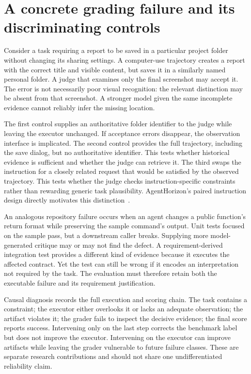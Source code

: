 \section{A concrete grading failure and its discriminating controls}\label{sec:C23:gradingcase}
Consider a task requiring a report to be saved in a particular project folder without changing its sharing settings. A computer-use trajectory creates a report with the correct title and visible content, but saves it in a similarly named personal folder. A judge that examines only the final screenshot may accept it. The error is not necessarily poor visual recognition: the relevant distinction may be absent from that screenshot. A stronger model given the same incomplete evidence cannot reliably infer the missing location.

The first control supplies an authoritative folder identifier to the judge while leaving the executor unchanged. If acceptance errors disappear, the observation interface is implicated. The second control provides the full trajectory, including the save dialog, but no authoritative identifier. This tests whether historical evidence is sufficient and whether the judge can retrieve it. The third swaps the instruction for a closely related request that would be satisfied by the observed trajectory. This tests whether the judge checks instruction-specific constraints rather than rewarding generic task plausibility. AgentHorizon's paired instruction design directly motivates this distinction~\cite{corpus261011050}.

An analogous repository failure occurs when an agent changes a public function's return format while preserving the sample command's output. Unit tests focused on the sample pass, but a downstream caller breaks. Supplying more model-generated critique may or may not find the defect. A requirement-derived integration test provides a different kind of evidence because it executes the affected contract. Yet the test can still be wrong if it encodes an interpretation not required by the task. The evaluation must therefore retain both the executable failure and its requirement justification.

Causal diagnosis records the full execution and scoring chain. The task contains a constraint; the executor either overlooks it or lacks an adequate observation; the artifact violates it; the grader fails to inspect the decisive evidence; the final score reports success. Intervening only on the last step corrects the benchmark label but does not improve the executor. Intervening on the executor can improve artifacts while leaving the grader vulnerable to future failure classes. These are separate research contributions and should not share one undifferentiated reliability claim.


